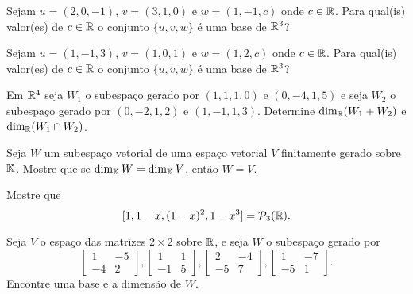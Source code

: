 \documentclass[12pt]{exam}
\begin{document}
    \begin{exercicio}
        Sejam $u = (2, 0 , -1)$, $v = (3, 1 , 0)$ e $w = (1, -1 , c)$ onde $c \in \mathbb{R}$. Para qual(is) valor(es) de $c \in \mathbb{R}$ o conjunto $\{u, v, w\}$ \'e uma base de $\mathbb{R}^3$?
    \end{exercicio}

    \begin{exercicio}
        Sejam $u = (1, -1 , 3)$, $v = (1, 0 , 1)$ e $w = (1, 2 , c)$ onde $c \in \mathbb{R}$. Para qual(is) valor(es) de $c \in \mathbb{R}$ o conjunto $\{u, v, w\}$ \'e uma base de $\mathbb{R}^3$?
    \end{exercicio}

    \begin{exercicio}
        Em $\mathbb{R}^4$ seja $W_1$ o subespa\c{c}o gerado por $(1,1,1,0)$ e $(0,-4,1,5)$ e seja $W_2$ o subespa\c{c}o gerado por $(0,-2,1,2)$ e $(1,-1,1,3)$. Determine $\dim_{\mathbb{R}}(W_1 + W_2)$ e $\dim_{\mathbb{R}}(W_1 \cap W_2)$.
    \end{exercicio}

    \begin{exercicio}
        Seja $W$ um subespa\c{c}o vetorial de uma espa\c{c}o vetorial $V$ finitamente gerado sobre $\mathbb{K}$. Mostre que se $\dim_{\mathbb{K}}W = \dim_{\mathbb{K}}V$, ent\~ao $W = V$.
    \end{exercicio}

    \begin{exercicio}
        Mostre que 
        \[
            [1, 1 - x, (1 - x)^2, 1 - x^3] = \mathcal{P}_3(\mathbb{R}).
        \]
    \end{exercicio}

    \begin{exercicio}
        Seja $V$ o espa\c{c}o das matrizes $2 \times 2$ sobre $\mathbb{R}$, e seja $W$ o subespa\c{c}o gerado por
        \[
            \begin{bmatrix}
                1 & -5\\
                -4 & 2
            \end{bmatrix},
            \begin{bmatrix}
                1 & 1\\
                -1 & 5
            \end{bmatrix},
            \begin{bmatrix}
                2 & -4\\
                -5 & 7
            \end{bmatrix},
            \begin{bmatrix}
                1 & -7\\
                -5 & 1
            \end{bmatrix}.
        \]
        Encontre uma base e a dimens\~ao de $W$.
    \end{exercicio}
\end{document}
